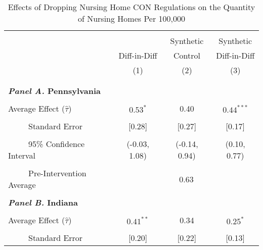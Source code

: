 \documentclass[../Main.tex]{subfiles}
\begin{document}
\newpage
\null
\vfill
\begin{table}[htbp]\centering \footnotesize
\def\sym#1{\ifmmode^{#1}\else\(^{#1}\)\fi}
\captionsetup{width=.75\textwidth}
\caption{\centering Effects of Dropping Nursing Home CON Regulations on the Quantity of Nursing Homes Per 100,000}
\label{tab:ave_results_q_nh_nobord_nocov}
\setlength{\tabcolsep}{10pt}
\begin{tabular}{l*{3}{c}}
\hline\hline
\\[-2ex]
&\multicolumn{1}{c}{}&\multicolumn{1}{c}{Synthetic}&\multicolumn{1}{c}{Synthetic}\\
&\multicolumn{1}{c}{Diff-in-Diff}&\multicolumn{1}{c}{Control}&\multicolumn{1}{c}{Diff-in-Diff}\\
&\multicolumn{1}{c}{(1)}&\multicolumn{1}{c}{(2)}&\multicolumn{1}{c}{(3)}\\
\\[-2ex]
\hline
\\[-.1ex]
\multicolumn{4}{l}{\textbf{\textit{Panel A.} Pennsylvania}}\\
\\[-1.5ex]
\multicolumn{1}{l}{Average Effect ($\hat{\tau}$)}&   \multicolumn{1}{c}{$0.53^{*}$}&   \multicolumn{1}{c}{0.40}&  \multicolumn{1}{c}{$0.44^{***}$}\\
\\[-2ex]
\multicolumn{1}{l}{\ \ \ \ \ Standard Error}  &\multicolumn{1}{c}{[0.28]}&\multicolumn{1}{c}{[0.27]}&\multicolumn{1}{c}{[0.17]}\\
\\[-2ex]
\multicolumn{1}{l}{\ \ \ \ \ 95\% Confidence Interval}&   \multicolumn{1}{c}{(-0.03, 1.08)}&   \multicolumn{1}{c}{(-0.14, 0.94)}&   \multicolumn{1}{c}{(0.10, 0.77)}\\
\\[-2ex]
\multicolumn{1}{l}{\ \ \ \ \ Pre-Intervention Average}&   \multicolumn{3}{c}{0.63}\\
\\[-.1ex]
\multicolumn{4}{l}{\textbf{\textit{Panel B.} Indiana}}\\
\\[-1.5ex]
\multicolumn{1}{l}{Average Effect ($\hat{\tau}$)}&   \multicolumn{1}{c}{$0.41^{**}$}&   \multicolumn{1}{c}{0.34} &  \multicolumn{1}{c}{$0.25^{*}$}\\
\\[-2ex]
\multicolumn{1}{l}{\ \ \ \ \ Standard Error}  &\multicolumn{1}{c}{[0.20]}&\multicolumn{1}{c}{[0.22]}&\multicolumn{1}{c}{[0.13]}\\

\end{tabular}
\end{table}
\end{document}
